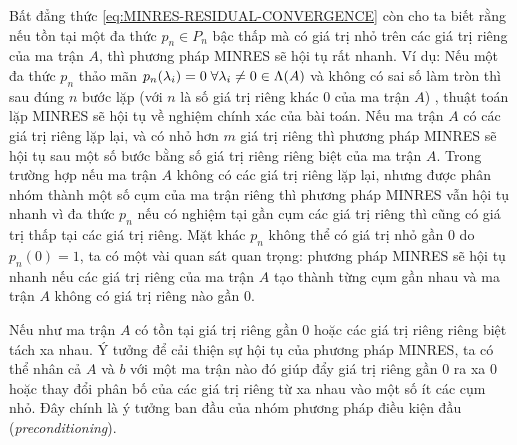 \documentclass[14pt, a4paper]{article}
\numberwithin{equation}{section}
\numberwithin{algorithm}{section}
\numberwithin{figure}{section}
\numberwithin{dl}{section}
\numberwithin{md}{section}
\numberwithin{bd}{section}
\numberwithin{dn}{section}
\begin{document}
\begin{enumerate}[a)]
    Bất đẳng thức \ref{eq:MINRES-RESIDUAL-CONVERGENCE} còn cho ta biết rằng nếu tồn tại một đa thức $p_n \in P_n$ bậc thấp mà có giá trị nhỏ trên các giá trị riêng của ma trận $A$, thì phương pháp MINRES sẽ hội tụ rất nhanh. Ví dụ: Nếu một đa thức $p_n$ thảo mãn $p_n(\lambda_i)=0  \thickspace \forall \lambda_i \neq 0 \in \Lambda(A)$ và không có sai số làm tròn thì sau đúng $n$ bước lặp (với $n$ là số giá trị riêng khác 0 của ma trận $A$) , thuật toán lặp MINRES sẽ hội tụ về nghiệm chính xác của bài toán.
    Nếu ma trận $A$ có các giá trị riêng lặp lại, và có nhỏ hơn $m$ giá trị riêng thì phương pháp MINRES sẽ hội tụ sau một số bước bằng số giá trị riêng riêng biệt của ma trận $A$. Trong trường hợp nếu ma trận $A$ không có các giá trị riêng lặp lại, nhưng được phân nhóm thành một số cụm của ma trận riêng thì phương pháp MINRES vẫn hội tụ nhanh vì đa thức $p_n$ nếu có nghiệm tại gần cụm các giá trị riêng thì cũng có giá trị thấp tại các giá trị riêng.
    Mặt khác $p_n$ không thể có giá trị nhỏ gần $0$ do $p_n(0)=1$, ta có một vài quan sát quan trọng: phương pháp MINRES sẽ hội tụ nhanh nếu các giá trị riêng của ma trận $A$ tạo thành từng cụm gần nhau và ma trận $A$ không có giá trị riêng nào gần 0.

    Nếu như ma trận $A$ có tồn tại giá trị riêng gần 0 hoặc các giá trị riêng riêng biệt tách xa nhau. Ý tưởng để cải thiện sự hội tụ của phương pháp MINRES, ta có thể nhân cả $A$ và $b$ với một ma trận nào đó giúp đẩy giá trị riêng gần 0 ra xa 0 hoặc thay đổi phân bố của các giá trị riêng từ xa nhau vào một số ít các cụm nhỏ. Đây chính là ý tưởng ban đầu của nhóm phương pháp điều kiện đầu (\textit{preconditioning}).


\end{enumerate}
\end{document}
